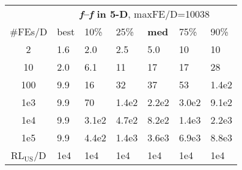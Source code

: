 \begin{tabular}{c|llllll}
 & \multicolumn{6}{|c}{\textbf{\textit{f}\raisebox{-0.35ex}{1}--\textit{f}\raisebox{-0.35ex}{24} in 5-D}, maxFE/D=10038}\\
\#FEs/D & best & 10\% & 25\% & \textbf{med} & 75\% & 90\%\\
2 & \hspace*{1ex}1.6 & \hspace*{1ex}2.0 & \hspace*{1ex}2.5 & \hspace*{1ex}5.0 & 10 & 10\\
10 & \hspace*{1ex}2.0 & \hspace*{1ex}6.1 & 11 & 17 & 17 & 28\\
100 & \hspace*{1ex}9.9 & 16 & 32 & 37 & 53 & 1.4e2\\
1e3 & \hspace*{1ex}9.9 & 70 & 1.4e2 & 2.2e2 & 3.0e2 & 9.1e2\\
1e4 & \hspace*{1ex}9.9 & 3.1e2 & 4.7e2 & 8.2e2 & 1.4e3 & 2.2e3\\
1e5 & \hspace*{1ex}9.9 & 4.4e2 & 1.4e3 & 3.6e3 & 6.9e3 & 8.8e3\\
$\text{RL}_{\text{US}}$/D & 1e4 & 1e4 & 1e4 & 1e4 & 1e4 & 1e4
\end{tabular}
